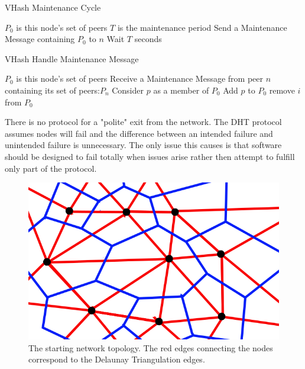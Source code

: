 \documentclass[11pt]{IEEEtran} %
\begin{document}
\begin{algorithm}
\caption{VHash Maintenance Cycle}
\label{maint}
\begin{algorithmic}[1]  %
	\STATE $P_0$ is this node's set of peers
    \STATE $T$ is the maintenance period
        	\STATE Send a Maintenance Message containing $P_0$ to $n$
        \ENDFOR
    \STATE Wait $T$ seconds
    \ENDWHILE
\end{algorithmic}
\end{algorithm}


\begin{algorithm}
\caption{VHash Handle Maintenance Message}
\label{handlemaint}
\begin{algorithmic}[1]  %
	\STATE $P_0$ is this node's set of peers
	\STATE Receive a Maintenance Message from peer $n$ containing its set of peers:$P_n$
    	\STATE Consider $p$ as a member of $P_0$
        	\STATE Add $p$ to $P_0$
                	\STATE remove $i$ from $P_0$
                \ENDIF
            \ENDFOR
        \ENDIF
    \ENDFOR
\end{algorithmic}
\end{algorithm}




There is no protocol for a "polite" exit from the network. The DHT protocol assumes nodes will fail and the difference between an intended failure and unintended failure is unnecessary. The only issue this causes is that software should be designed to fail totally when issues arise rather then attempt to fulfill only part of the protocol.  



\begin{figure}
    \includegraphics[width=\linewidth]{voronoi-churn2}
    \caption{The starting network topology. The red edges connecting the nodes correspond to the Delaunay Triangulation edges.}
    \label{churninit}
\end{figure}
\end{document}
